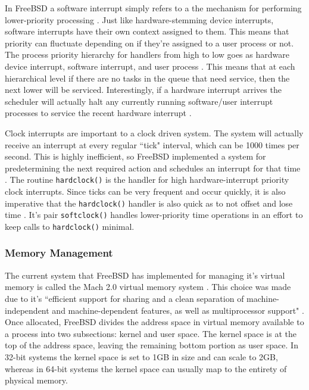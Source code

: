 \documentclass[10pt,draftclsnofoot,onecolumn]{IEEEtran}
\begin{document}
\par In FreeBSD a software interrupt simply refers to a the mechanism for performing lower-priority processing \cite{bsd:1}.
Just like hardware-stemming device interrupts, software interrupts have their own context assigned to them.
This means that priority can fluctuate depending on if they're assigned to a user process or not.
The process priority hierarchy for handlers from high to low goes as hardware device interrupt, software interrupt, and user process \cite{bsd:1}.
This means that at each hierarchical level if there are no tasks in the queue that need service, then the next lower will be serviced.
Interestingly, if a hardware interrupt arrives the scheduler will actually halt any currently running software/user interrupt processes to service the recent hardware interrupt \cite{bsd:1}.

\par Clock interrupts are important to a clock driven system.
The system will actually receive an interrupt at every regular ``tick" interval, which can be 1000 times per second.
This is highly inefficient, so FreeBSD implemented a system for predetermining the next required action and schedules an interrupt for that time \cite{bsd:1}.
The routine \texttt{hardclock()} is the handler for high hardware-interrupt priority clock interrupts.
Since ticks can be very frequent and occur quickly, it is also imperative that the \texttt{hardclock()} handler is also quick as to not offset and lose time \cite{bsd:1}.
It's pair \texttt{softclock()} handles lower-priority time operations in an effort to keep calls to \texttt{hardclock()} minimal.\\

\subsubsection{Memory Management}
\label{sub:Memory Management FreeBSD}
\par The current system that FreeBSD has implemented for managing it's virtual memory is called the Mach 2.0 virtual memory system \cite{bsd:1}.
This choice was made due to it's ``efficient support for sharing and a clean separation of machine-independent and machine-dependent features, as well as multiprocessor support" \cite{bsd:1}.
Once allocated, FreeBSD divides the address space in virtual memory available to a process into two subsections: kernel and user space.
The kernel space is at the top of the address space, leaving the remaining bottom portion as user space.
In 32-bit systems the kernel space is set to 1GB in size and can scale to 2GB, whereas in 64-bit systems the kernel space can usually map to the entirety of physical memory.
\end{document}
